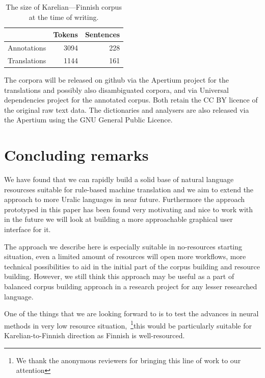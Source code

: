 \documentclass{flammie}
\begin{document}
\begin{table}
    \begin{tabular}{lrr}
        \toprule
         & Tokens & Sentences \\
        \midrule
        Annotations & 3094 & 228 \\
        Translations & 1144 & 161 \\
        \bottomrule
    \end{tabular}
    \caption{The size of Karelian---Finnish corpus at the time of
    writing.\label{table:sizes}}
\end{table}

The corpora will be released on github via the Apertium project for the
translations and possibly also disambiguated corpora, and via Universal
dependencies project for the annotated corpus. Both retain the CC BY
licence of the original raw text data. The dictionaries and analysers
are also released via the Apertium using the GNU General Public Licence.

\section{Concluding remarks}\label{sec:conclusion}

We have found that we can rapidly build a solid base of natural language
resourcses suitable for rule-based machine translation and we aim to extend the
approach to more Uralic languages in near future. Furthermore the approach
prototyped in this paper has been found very motivating and nice to work with
in the future we will look at building a more approachable graphical user
interface for it.

The approach we describe here is especially suitable in no-resources starting
situation, even a limited amount of resources will open more workflows, more
technical possibilities to aid in the initial part of the corpus building and
resource building. However, we still think this approach may be useful as a
part of balanced corpus building approach in a research project for any lesser
researched language.

One of the things that we are looking forward to is to test the advances in
neural methods in very low resource
situation,~\cite{neubig2018rapid}\footnote{We thank the anonymous reviewers for
bringing this line of work to our attention }this would be particularly suitable
for Karelian-to-Finnish direction as Finnish is well-resourced.



\end{document}
